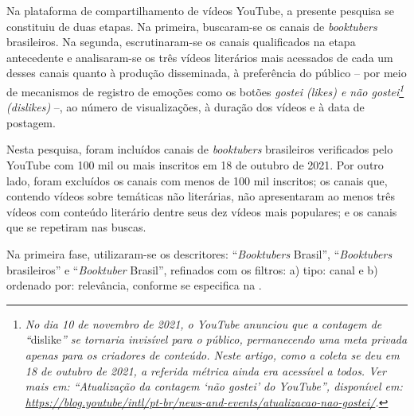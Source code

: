 \documentclass[portuguese]{textolivre}
\begin{document}
Na plataforma de compartilhamento de vídeos YouTube, a presente pesquisa
se constituiu de duas etapas. Na primeira, buscaram-se os canais de
\emph{booktubers} brasileiros. Na segunda, escrutinaram-se os canais
qualificados na etapa antecedente e analisaram-se os três vídeos
literários mais acessados de cada um desses canais quanto à produção
disseminada, à preferência do público -- por meio de mecanismos de
registro de emoções como os botões \emph{gostei (likes) e não
gostei\footnote{\emph{ No dia 10 de novembro de 2021, o YouTube anunciou
  que a contagem de ``}dislike\emph{'' se tornaria invisível para o
  público, permanecendo uma meta privada apenas para os criadores de
  conteúdo. Neste artigo, como a coleta se deu em 18 de outubro de 2021,
  a referida métrica ainda era acessível a todos. Ver mais em:
  ``Atualização da contagem `não gostei' do YouTube'', disponível em:
  \url{https://blog.youtube/intl/pt-br/news-and-events/atualizacao-nao-gostei/}.}}
(dislikes)} --, ao número de visualizações, à duração dos vídeos e à
data de postagem.

Nesta pesquisa, foram incluídos canais de \emph{booktubers}
brasileiros verificados pelo YouTube com 100 mil ou mais
inscritos em 18 de outubro de 2021. Por outro lado, foram excluídos os
canais com menos de 100 mil inscritos; os canais que, contendo vídeos
sobre temáticas não literárias, não apresentaram ao menos três vídeos
com conteúdo literário dentre seus dez vídeos mais populares; e os
canais que se repetiram nas buscas.

Na primeira fase, utilizaram-se os descritores: ``\emph{Booktubers
}Brasil'', ``\emph{Booktubers} brasileiros'' e ``\emph{Booktuber}
Brasil'', refinados com os filtros: a) tipo: canal e b) ordenado por:
relevância, conforme se especifica na .
\end{document}
